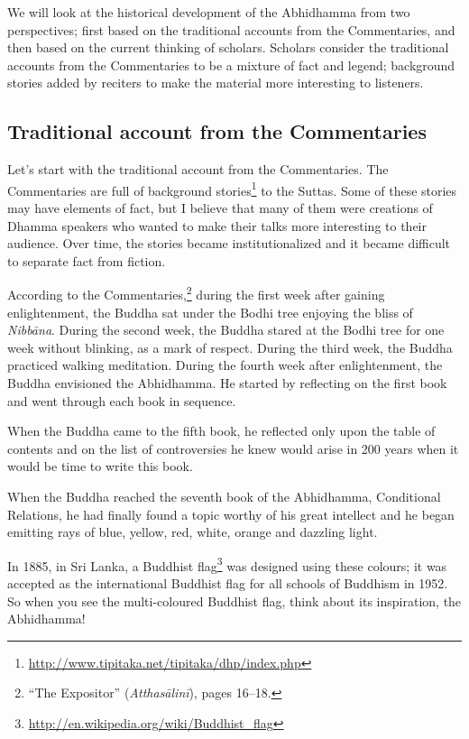 We will look at the historical development of the Abhidhamma from two perspectives; first based on the traditional accounts from the Commentaries, and then based on the current thinking of scholars. Scholars consider the traditional accounts from the Commentaries to be a mixture of fact and legend; background stories added by reciters to make the material more interesting to listeners. 

\pagebreak

\subsection*{Traditional account from the Commentaries}

Let’s start with the traditional account from the Commentaries. The Commentaries are full of background stories\footnote{\url{http://www.tipitaka.net/tipitaka/dhp/index.php}} to the Suttas. Some of these stories may have elements of fact, but I believe that many of them were creations of Dhamma speakers who wanted to make their talks more interesting to their audience. Over time, the stories became institutionalized and it became difficult to separate fact from fiction.

According to the Commentaries,\footnote{“The Expositor” (\textit{Atthasālinī}), pages 16--18.} during the first week after gaining enlightenment, the Buddha sat under the Bodhi tree enjoying the bliss of \textit{Nibbāna}. During the second week, the Buddha stared at the Bodhi tree for one week without blinking, as a mark of respect. During the third week, the Buddha practiced walking meditation. During the fourth week after enlightenment, the Buddha envisioned the Abhidhamma. He started by reflecting on the first book and went through each book in sequence. 

When the Buddha came to the fifth book, he reflected only upon the table of contents and on the list of controversies he knew would arise in 200 years when it would be time to write this book.

When the Buddha reached the seventh book of the Abhidhamma, Conditional Relations, he had finally found a topic worthy of his great intellect and he began emitting rays of blue, yellow, red, white, orange and dazzling light. 

In 1885, in Sri Lanka, a Buddhist flag\footnote{\url{http://en.wikipedia.org/wiki/Buddhist_flag}} was designed using these colours; it was accepted as the international Buddhist flag for all schools of Buddhism in 1952. So when you see the multi-coloured Buddhist flag, think about its inspiration, the Abhidhamma!

